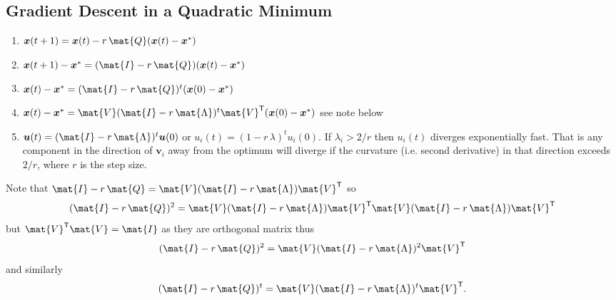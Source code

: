 \documentclass[11pt]{article}
\newcommand{\tr}{\textsf{T}}
\begin{document}
\subsection{Gradient Descent in a Quadratic Minimum}
\label{sec:orgf822133}
\begin{enumerate}
\item \(\bm{x}(t+1) = \bm{x}(t) - r\,\mat{Q} (\bm{x}(t)-\bm{x}^{*})\)
\item \(\bm{x}(t+1) - \bm{x}^{*} = (\mat{I}- r\,\mat{Q}) (\bm{x}(t)-\bm{x}^{*})\)
\item \(\bm{x}(t) - \bm{x}^{*} = (\mat{I}- r\,\mat{Q})^t (\bm{x}(0)-\bm{x}^{*})\)
\item \(\bm{x}(t) - \bm{x}^{*} = \mat{V}(\mat{I}- r\,\mat{\Lambda})^t\mat{V}^{\tr} (\bm{x}(0)-\bm{x}^{*})\)
see note below
\item \(\bm{u}(t) = (\mat{I}-r\,\mat{\Lambda})^t \bm{u}(0)\) or 
\(u_i(t) = (1-r\,\lambda)^t u_i(0)\).  If \(\lambda_i > 2/r\) then
\(u_i(t)\) diverges exponentially fast.  That is any component in
the direction of \(\bm{v}_{i}\) away from the optimum will diverge
if the curvature (i.e. second derivative) in that direction
exceeds \(2/r\), where \(r\) is the step size.
\end{enumerate}
Note that \(\mat{I}- r\,\mat{Q} =  \mat{V}(\mat{I}-r\,\mat{\Lambda})\mat{V}^{\tr}\) so
$$ (\mat{I}- r\,\mat{Q})^2 =   \mat{V}(\mat{I}-r\,\mat{\Lambda})\mat{V}^{\tr}  \mat{V}(\mat{I}-r\,\mat{\Lambda})\mat{V}^{\tr}$$
but \(\mat{V}^{\tr} \mat{V} = \mat{I}\) as they are orthogonal matrix
thus
$$ (\mat{I}- r\,\mat{Q})^2 =   \mat{V}(\mat{I}-r\,\mat{\Lambda})^{2}\mat{V}^{\tr}$$
and similarly
$$ (\mat{I}- r\,\mat{Q})^t =   \mat{V}(\mat{I}-r\,\mat{\Lambda})^{t}\mat{V}^{\tr}.$$
\end{document}
